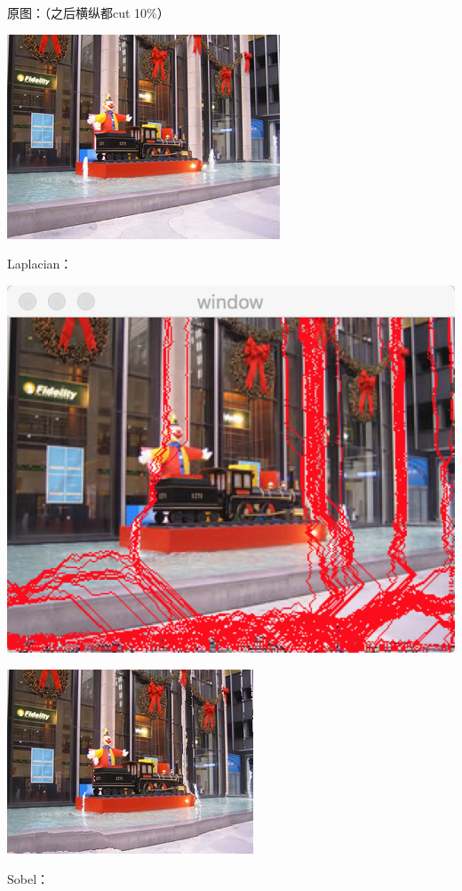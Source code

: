 \documentclass[10pt, a4paper]{article}
\begin{document}
    原图：（之后横纵都cut 10$\%$）

    \includegraphics[scale = .3]{3.jpg}

    Laplacian：

    \includegraphics[scale = .3]{3lapseam.png}

    \includegraphics[scale = .3]{3lap.jpg}

    Sobel：
\end{document}
